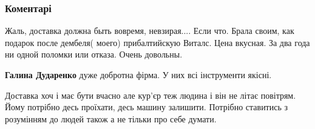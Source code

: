  
 
 
 
 
\subsubsection{Коментарі}

\begin{itemize}
 
Жаль, доставка должна быть вовремя, невзирая.... Если что. Брала своим, как подарок после дембеля( моего) прибалтийскую Виталс. Цена вкусная. За два года ни одной поломки или отказа. Очень довольны.


\begin{itemize}
 
\textbf{Галина Дударенко} дуже добротна фірма. У них всі інструменти якісні.

 
Доставка хоч і має бути вчасно але кур'єр теж людина і він не літає повітрям. Йому потрібно десь проїхати, десь машину залишити. Потрібно ставитись з розумінням до людей також а не тільки про себе думати.

 

\end{itemize}
\end{itemize}
